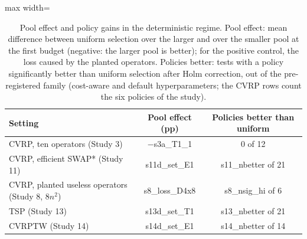 \begin{table}[t]
\caption{Pool effect and policy gains in the deterministic regime. Pool effect: mean difference between uniform selection over the larger and over the smaller pool at the first budget (negative: the larger pool is better); for the positive control, the loss caused by the planted operators. Policies better: tests with a policy significantly better than uniform selection after Holm correction, out of the pre-registered family (cost-aware and default hyperparameters; the CVRP rows count the six policies of the study).}\label{tab:sintese}
\centering\small
\begin{adjustbox}{max width=\linewidth}
\begin{tabular}{lcc}
\toprule
Setting & Pool effect (pp) & Policies better than uniform \\
\midrule
CVRP, ten operators (Study 3) & $-$\num{s3a_T1_1} & 0 of 12 \\
CVRP, efficient SWAP* (Study 11) & \num{s11d_set_E1} & \num{s11_nbetter} of 21 \\
CVRP, planted useless operators (Study 8, $8n^2$) & \num{s8_loss_D4x8} & \num{s8_nsig_hi} of 6 \\
TSP (Study 13) & \num{s13d_set_T1} & \num{s13_nbetter} of 21 \\
CVRPTW (Study 14) & \num{s14d_set_E1} & \num{s14_nbetter} of 14 \\
\bottomrule
\end{tabular}
\end{adjustbox}
\end{table}
